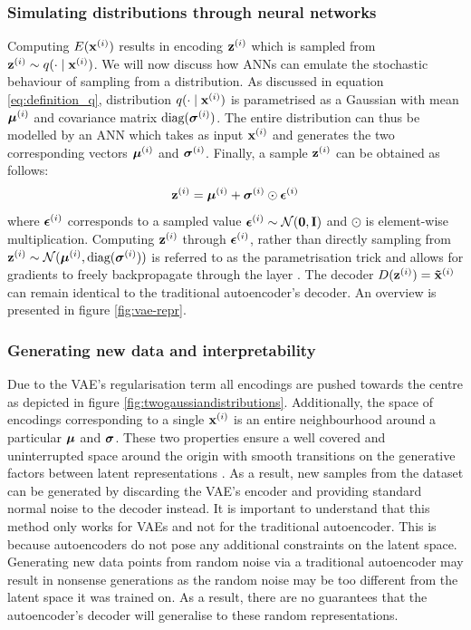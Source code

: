 \subsubsection{Simulating distributions through neural networks}
	Computing $E(\mathbf{x}^{(i)})$ results in encoding $\mathbf{z}^{(i)}$ which is sampled from $\mathbf{z}^{(i)} \sim q ( \cdot \mid \mathbf{x}^{(i)})$. We will now discuss how ANNs can emulate the stochastic behaviour of sampling from a distribution. As discussed in equation \ref{eq:definition_q}, distribution $q ( \cdot \mid \mathbf{x}^{(i)})$ is parametrised as a Gaussian with mean $\bm{\mu}^{(i)}$ and covariance matrix $\text{diag}(\bm{\sigma}^{(i)})$. The entire distribution can thus be modelled by an ANN which takes as input $\mathbf{x}^{(i)}$ and generates the two corresponding vectors $\bm{\mu}^{(i)}$ and $\bm{\sigma}^{(i)}$. Finally, a sample $\mathbf{z}^{(i)}$ can be obtained as follows:
	\begin{equation}
		\mathbf{z}^{(i)} = \bm{\mu}^{(i)} + \bm{\sigma}^{(i)} \odot \bm{\epsilon}^{(i)}
	\end{equation}
	where $\bm{\epsilon}^{(i)}$ corresponds to a sampled value $\bm{\epsilon}^{(i)} \sim \mathcal{N}(\bm{\mathbf{0}}, \mathbf{I})$ and $\odot$ is element-wise multiplication. Computing $\mathbf{z}^{(i)}$ through $\bm{\epsilon}^{(i)}$, rather than directly sampling from $\mathbf{z}^{(i)} \sim \mathcal{N}(\bm{\mu}^{(i)}, \text{diag}(\bm{\sigma}^{(i)}))$ is referred to as the parametrisation trick and allows for gradients to freely backpropagate through the layer \citep{davidfosterVariationalAutoencoders2023}. The decoder $D(\mathbf{z}^{(i)}) = \mathbf{\tilde{x}}^{(i)}$ can remain identical to the traditional autoencoder's decoder. An overview is presented in figure \ref{fig:vae-repr}.
	
	
	
	
	
	




	
	


\subsubsection{Generating new data and interpretability}	
	Due to the VAE's regularisation term all encodings are pushed towards the centre as depicted in figure \ref{fig:twogaussiandistributions}. Additionally, the space of encodings corresponding to a single $\mathbf{x}^{(i)}$ is an entire neighbourhood around a particular $\bm{\mu}$ and $\bm{\sigma}$. These two properties ensure a well covered and uninterrupted space around the origin with smooth transitions on the generative factors between latent representations \citep{davidfosterVariationalAutoencoders2023}. As a result, new samples from the dataset can be generated by discarding the VAE's encoder and providing standard normal noise to the decoder instead. It is important to understand that this method only works for VAEs and not for the traditional autoencoder. This is because autoencoders do not pose any additional constraints on the latent space. Generating new data points from random noise via a traditional autoencoder may result in nonsense generations as the random noise may be too different from the latent space it was trained on. As a result, there are no guarantees that the autoencoder's decoder will generalise to these random representations.
	
